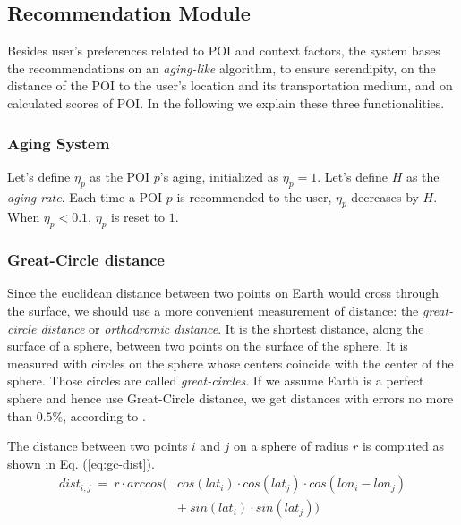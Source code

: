 \subsection{Recommendation Module}


Besides user's preferences related to POI and context factors, the system bases the recommendations on  an {\it aging-like} algorithm,  to ensure serendipity, on the distance of the POI to the user's location and its transportation medium, and on calculated scores of POI. In the following we explain these three functionalities.

\subsubsection{\bf Aging System}

Let's define $\eta_p$ as the POI $p$'s aging, initialized as $\eta_p = 1$. Let's define $H$ as the \textit{aging rate}. Each time a POI $p$ is recommended to the user, $\eta_p$ decreases by $H$. When $\eta_p < 0.1$, $\eta_p$ is reset to $1$. 

\subsubsection{\bf Great-Circle distance}
Since the euclidean distance between two points on Earth would cross through the surface, we should use a more convenient measurement of distance: the \textit{great-circle distance} or \textit{orthodromic distance}. It is the shortest distance, along the surface of a sphere, between two points on the surface of the sphere. It is measured with circles on the sphere whose centers coincide with the center of the sphere. Those circles are called \textit{great-circles}. If we assume Earth is a perfect sphere and hence use Great-Circle distance, we get distances with errors no more than $0.5\%$, according to \cite{1997admiralty}. 

The distance between two points $i$ and $j$ on a sphere of radius $r$ is computed as shown in Eq. (\ref{eq:gc-dist}).
\begin{equation} \label{eq:gc-dist}
    \begin{split}
        \scriptstyle{dist_{i,j} \ = \ r \cdot arccos (} & \scriptstyle{cos(lat_i) \cdot cos(lat_j) \cdot cos(lon_i - lon_j)} \\
                                        & \scriptstyle{+ \ sin(lat_i) \cdot sin(lat_j) )}
    \end{split}
\end{equation}

